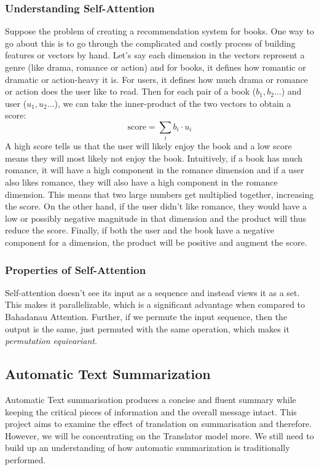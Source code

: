 \documentclass[12pt,a4paper,twoside,openright]{report}
\begin{document}
\subsubsection{Understanding Self-Attention}
Suppose the problem of creating a recommendation system for books. One way to go about this is to go through the complicated and costly process of building features or vectors by hand. Let's say each dimension in the vectors represent a genre (like drama, romance or action) and for books, it defines how romantic or dramatic or action-heavy it is. For users, it defines how much drama or romance or action does the user like to read. Then for each pair of a book ($b_1, b_2...$) and user ($u_1, u_2...$), we can take the inner-product of the two vectors to obtain a score:
\[ \text{score} = \sum_i b_i \cdot u_i \]
A high score tells us that the user will likely enjoy the book and a low score means they will most likely not enjoy the book. Intuitively, if a book has much romance, it will have a high component in the romance dimension and if a user also likes romance, they will also have a high component in the romance dimension. This means that two large numbers get multiplied together, increasing the score. On the other hand, if the user didn't like romance, they would have a low or possibly negative magnitude in that dimension and the product will thus reduce the score. Finally, if both the user and the book have a negative component for a dimension, the product will be positive and augment the score.

\subsubsection{Properties of Self-Attention}
Self-attention doesn't see its input as a sequence and instead views it as a set. This makes it parallelizable, which is a significant advantage when compared to Bahadanau Attention. Further, if we permute the input sequence, then the output is the same, just permuted with the same operation, which makes it \textit{permutation equivariant}.



\subsection{Automatic Text Summarization}
\label{auto-text-summarization}
Automatic Text summarisation produces a concise and fluent summary while keeping the critical pieces of information and the overall message intact. This project aims to examine the effect of translation on summarisation and therefore. However, we will be concentrating on the Translator model more. We still need to build up an understanding of how automatic summarization is traditionally performed.
\end{document}

